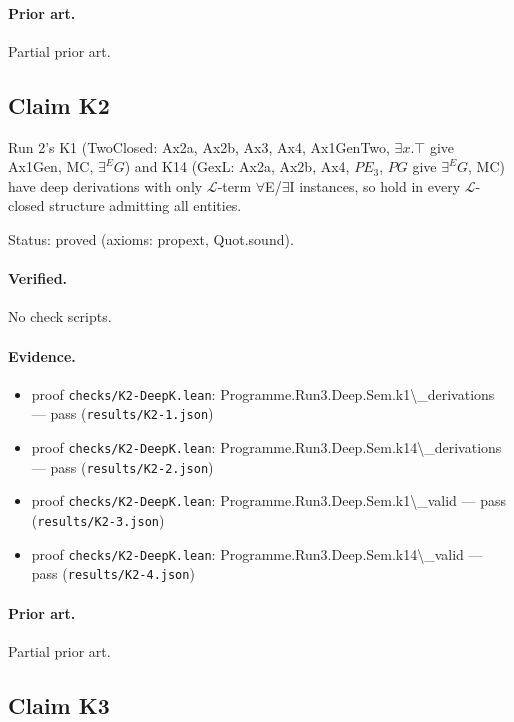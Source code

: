 \documentclass{article}
\begin{document}
\paragraph{Prior art.} Partial prior art.

\subsection*{Claim K2}

Run 2's K1 (TwoClosed: Ax2a, Ax2b, Ax3, Ax4, Ax1GenTwo, $\exists x.\top$ give Ax1Gen, MC, $\exists^E G$) and K14 (GexL: Ax2a, Ax2b, Ax4, $P E_3$, $P G$ give $\exists^E G$, MC) have deep derivations with only $\mathcal{L}$-term $\forall$E/$\exists$I instances, so hold in every $\mathcal{L}$-closed structure admitting all entities.

Status: proved (axioms: propext, Quot.sound).

\paragraph{Verified.}
No check scripts.

\paragraph{Evidence.}
\begin{itemize}
\item proof \texttt{checks/K2-DeepK.lean}: Programme.Run3.Deep.Sem.k1\textbackslash{}\_derivations --- pass (\texttt{results/K2-1.json})
\item proof \texttt{checks/K2-DeepK.lean}: Programme.Run3.Deep.Sem.k14\textbackslash{}\_derivations --- pass (\texttt{results/K2-2.json})
\item proof \texttt{checks/K2-DeepK.lean}: Programme.Run3.Deep.Sem.k1\textbackslash{}\_valid --- pass (\texttt{results/K2-3.json})
\item proof \texttt{checks/K2-DeepK.lean}: Programme.Run3.Deep.Sem.k14\textbackslash{}\_valid --- pass (\texttt{results/K2-4.json})
\end{itemize}

\paragraph{Prior art.} Partial prior art.

\subsection*{Claim K3}
\end{document}
